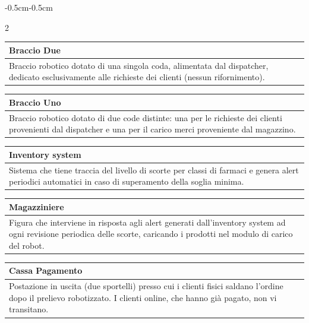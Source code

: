 \documentclass{article}
\begin{document}
\begin{adjustwidth}{-0.5cm}{-0.5cm}
\begin{multicols}{2}
\begin{minipage}{\linewidth}
\centering
\begin{tabularx}{\linewidth}{|X|}
  \hline
  \textbf{Braccio Due} \\
  \hline
    Braccio robotico dotato di una singola coda, alimentata dal dispatcher, dedicato esclusivamente alle richieste dei clienti (nessun rifornimento).\\
  \hline
\end{tabularx}
\end{minipage}

\begin{minipage}{\linewidth}
\centering
\begin{tabularx}{\linewidth}{|X|}
  \hline
  \textbf{Braccio Uno} \\
  \hline
    Braccio robotico dotato di due code distinte: una per le richieste dei clienti provenienti dal dispatcher e una per il carico merci proveniente dal magazzino. \\
  \hline
\end{tabularx}
\end{minipage}

\begin{minipage}{\linewidth}
\centering
\begin{tabularx}{\linewidth}{|X|}
  \hline
  \textbf{Inventory system} \\
  \hline
   Sistema che tiene traccia del livello di scorte per classi di farmaci e genera alert periodici automatici in caso di superamento della soglia minima. \\
  \hline
\end{tabularx}
\end{minipage}

\begin{minipage}{\linewidth}
\centering
\begin{tabularx}{\linewidth}{|X|}
  \hline
  \textbf{Magazziniere} \\
  \hline
   Figura che interviene in risposta agli alert generati dall'inventory system ad ogni revisione periodica delle scorte, caricando i prodotti nel modulo di carico del robot. \\
  \hline
\end{tabularx}
\end{minipage}

\begin{minipage}{\linewidth}
\centering
\begin{tabularx}{\linewidth}{|X|}
  \hline
  \textbf{Cassa Pagamento} \\
  \hline
   Postazione in uscita (due sportelli) presso cui i clienti fisici saldano l'ordine dopo il prelievo robotizzato. I clienti online, che hanno già pagato, non vi transitano. \\
  \hline
\end{tabularx}
\end{minipage}
\end{multicols}
\vspace{-2pt}


\end{adjustwidth}
\end{document}
